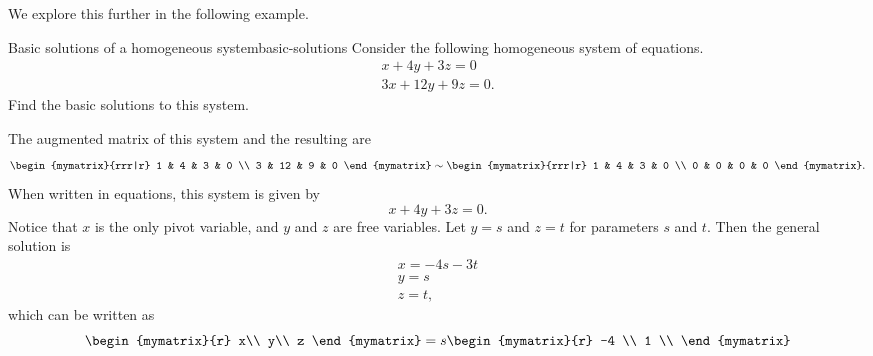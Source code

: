 We explore this further in the following example.

\begin{example}{Basic solutions of a homogeneous system}{basic-solutions}
  Consider the following homogeneous system of equations. 
  \begin{equation}\label{eqn:basic-solutions-1}
    \begin{array}{c}
      x + 4y + 3z = 0 \\
      3x + 12y + 9z = 0.
    \end{array}
  \end{equation}
  Find the basic solutions to this system.
\end{example}

\begin{solution}
  The augmented matrix of this system and the resulting {\rref} are 
  \begin{equation*}
    \begin{mymatrix}{rrr|r}
      1 & 4 & 3 & 0 \\
      3 & 12 & 9 & 0
    \end{mymatrix}
    \roweq
    \begin{mymatrix}{rrr|r}
      1 & 4 & 3 & 0 \\
      0 & 0 & 0 & 0
    \end{mymatrix}.
  \end{equation*}
  When written in equations, this system is given by 
  \begin{equation*}
    x + 4y +3z=0.
  \end{equation*}
  Notice that $x$ is the only pivot variable, and $y$ and $z$ are free
  variables. Let $y = s$ and $z=t$ for parameters $s$ and $t$. Then the
  general solution is
  \begin{equation*}
    \begin{array}{c}
      x = -4s - 3t \\
      y = s \\
      z = t,
    \end{array}
  \end{equation*}
  which can be written as 
  \begin{equation*}
    \begin{mymatrix}{r}
      x\\
      y\\
      z
    \end{mymatrix}
    =
    s
    \begin{mymatrix}{r}
      -4 \\
      1 \\

\end{mymatrix}
\end{equation*}
\end{solution}
